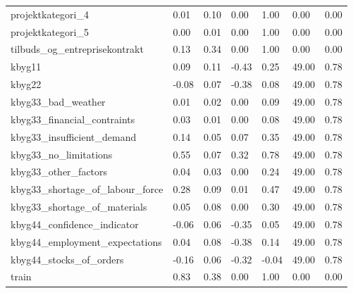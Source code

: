 \begin{landscape}
\begin{longtable}[h!]{lllllll}
projektkategori_4 & 0.01 & 0.10 & 0.00 & 1.00 & 0.00 & 0.00 \\
projektkategori_5 & 0.00 & 0.01 & 0.00 & 1.00 & 0.00 & 0.00 \\
tilbuds_og_entreprisekontrakt & 0.13 & 0.34 & 0.00 & 1.00 & 0.00 & 0.00 \\
kbyg11 & 0.09 & 0.11 & -0.43 & 0.25 & 49.00 & 0.78 \\
kbyg22 & -0.08 & 0.07 & -0.38 & 0.08 & 49.00 & 0.78 \\
kbyg33_bad_weather & 0.01 & 0.02 & 0.00 & 0.09 & 49.00 & 0.78 \\
kbyg33_financial_contraints & 0.03 & 0.01 & 0.00 & 0.08 & 49.00 & 0.78 \\
kbyg33_insufficient_demand & 0.14 & 0.05 & 0.07 & 0.35 & 49.00 & 0.78 \\
kbyg33_no_limitations & 0.55 & 0.07 & 0.32 & 0.78 & 49.00 & 0.78 \\
kbyg33_other_factors & 0.04 & 0.03 & 0.00 & 0.24 & 49.00 & 0.78 \\
kbyg33_shortage_of_labour_force & 0.28 & 0.09 & 0.01 & 0.47 & 49.00 & 0.78 \\
kbyg33_shortage_of_materials & 0.05 & 0.08 & 0.00 & 0.30 & 49.00 & 0.78 \\
kbyg44_confidence_indicator & -0.06 & 0.06 & -0.35 & 0.05 & 49.00 & 0.78 \\
kbyg44_employment_expectations & 0.04 & 0.08 & -0.38 & 0.14 & 49.00 & 0.78 \\
kbyg44_stocks_of_orders & -0.16 & 0.06 & -0.32 & -0.04 & 49.00 & 0.78 \\
train & 0.83 & 0.38 & 0.00 & 1.00 & 0.00 & 0.00 \\
\end{longtable}\end{landscape}
